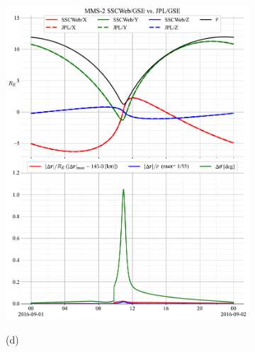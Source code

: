 \documentclass[draft]{agujournal2019}
\begin{document}
\begin{figure}[h]
\begin{subfigure}[b]{0.49\textwidth}
         \includegraphics[width=\textwidth]{code/figures/ephemeris/MMS-2_SSCWeb-GSE_vs_JPL-GSE.pdf}
     \end{subfigure}
     \begin{subfigure}[b]{0.49\textwidth}
         (d)
         \centering

\end{subfigure}
\end{figure}
\end{document}
